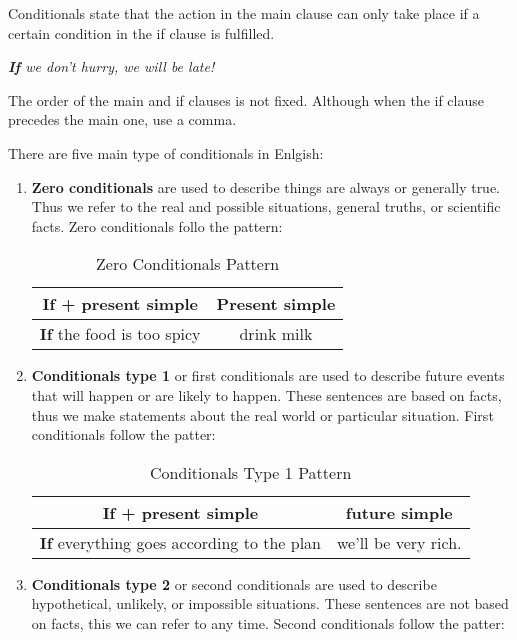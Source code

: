 \documentclass[hidelinks,10pt,a4paper]{article}
\begin{document}
Conditionals state that the action in the main clause can only take place if a certain condition in the if clause is fulfilled.

\begin{center}
	\textit{\textbf{If} we don't hurry, we will be late!}
\end{center}

The order of the main and if clauses is not fixed. Although when the if clause precedes the main one, use a comma.

\newpage
There are five main type of conditionals in Enlgish:

\begin{enumerate}[label=(\alph*)]
	\item \textbf{Zero conditionals} are used to describe things are always or generally true. Thus we refer to the real and possible situations, general truths, or scientific facts. Zero conditionals follo the pattern:
		\begin{table}[h]
		\begin{center}
		\begin{tabular}{|c|c|}
			\hline
			\textbf{If + present simple} & \textbf{Present simple} \\ \hline
			\textbf{If} the food is too spicy & drink milk \\ \hline
		\end{tabular}
		\end{center}
		\caption{Zero Conditionals Pattern} \label{tab:zcp}
		\end{table}
	\item \textbf{Conditionals type 1} or first conditionals are used to describe future events that will happen or are likely to happen. These sentences are based on facts, thus we make statements about the real world or particular situation. First conditionals follow the patter:
		\begin{table}[h]
		\begin{center}
		\begin{tabular}{|c|c|}
			\hline
			\textbf{If + present simple} & \textbf{future simple}\\ \hline
			\textbf{If} everything goes according to the plan & we'll be very rich. \\ \hline
		\end{tabular}
		\end{center}
		\caption{Conditionals Type 1 Pattern} \label{tab:ct1}
		\end{table}
	\item \textbf{Conditionals type 2} or second conditionals are used to describe hypothetical, unlikely, or impossible situations. These sentences are not based on facts, this we can refer to any time. Second conditionals follow the patter:

\end{enumerate}
\end{document}
